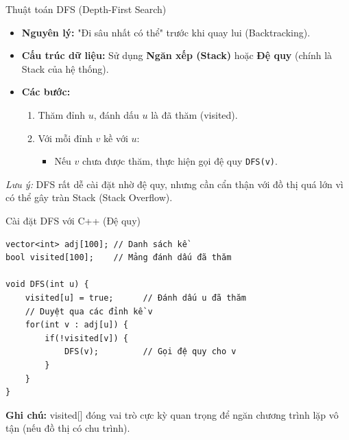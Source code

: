 \documentclass{beamer}
\begin{document}
\begin{frame}{Thuật toán DFS (Depth-First Search)}
    \begin{itemize}
        \item \textbf{Nguyên lý:} "Đi sâu nhất có thể" trước khi quay lui (Backtracking).
        \item \textbf{Cấu trúc dữ liệu:} Sử dụng \textbf{Ngăn xếp (Stack)} hoặc \textbf{Đệ quy} (chính là Stack của hệ thống).
        \item \textbf{Các bước:}
        \begin{enumerate}
            \item Thăm đỉnh $u$, đánh dấu $u$ là đã thăm (visited).
            \item Với mỗi đỉnh $v$ kề với $u$:
            \begin{itemize}
                \item Nếu $v$ chưa được thăm, thực hiện gọi đệ quy \texttt{DFS(v)}.
            \end{itemize}
        \end{enumerate}
    \end{itemize}
    \vspace{0.2cm}
    \textit{Lưu ý:} DFS rất dễ cài đặt nhờ đệ quy, nhưng cần cẩn thận với đồ thị quá lớn vì có thể gây tràn Stack (Stack Overflow).
\end{frame}
\begin{frame}[fragile]{Cài đặt DFS với C++ (Đệ quy)}
\begin{verbatim}
vector<int> adj[100]; // Danh sách kề
bool visited[100];    // Mảng đánh dấu đã thăm

void DFS(int u) {
    visited[u] = true;      // Đánh dấu u đã thăm
    // Duyệt qua các đỉnh kề v
    for(int v : adj[u]) {
        if(!visited[v]) {
            DFS(v);         // Gọi đệ quy cho v
        }
    }
}
\end{verbatim}
\textbf{Ghi chú:} visited[] đóng vai trò cực kỳ quan trọng để ngăn chương trình lặp vô tận (nếu đồ thị có chu trình).
\end{frame}
\end{document}
